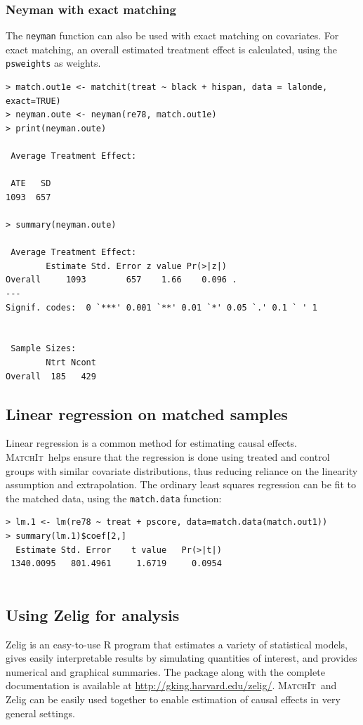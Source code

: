 \documentclass[oneside,letterpaper,titlepage]{article}
\newcommand{\MatchIt}{\textsc{MatchIt}}
\begin{document}
\subsubsection{Neyman with exact matching}
The {\tt neyman} function can also be used with exact matching on
covariates.  For exact matching, an overall estimated treatment effect
is calculated, using the {\tt psweights} as weights.

\begin{verbatim}
> match.out1e <- matchit(treat ~ black + hispan, data = lalonde, exact=TRUE)
> neyman.oute <- neyman(re78, match.out1e)
> print(neyman.oute)
 
 Average Treatment Effect:
  
 ATE   SD
1093  657
 
> summary(neyman.oute)
 
 Average Treatment Effect:
        Estimate Std. Error z value Pr(>|z|)
Overall     1093        657    1.66    0.096 .
---
Signif. codes:  0 `***' 0.001 `**' 0.01 `*' 0.05 `.' 0.1 ` ' 1
 
 
 Sample Sizes:
        Ntrt Ncont
Overall  185   429
\end{verbatim}

\subsection{Linear regression on matched samples}
\label{linreg}
Linear regression is a common method for estimating causal effects.
\MatchIt\ helps ensure that the regression is done using treated and
control groups with similar covariate distributions, thus reducing
reliance on the linearity assumption and extrapolation.  The ordinary
least squares regression can be fit to the matched data, using the
{\tt match.data} function:

\begin{verbatim}
> lm.1 <- lm(re78 ~ treat + pscore, data=match.data(match.out1))
> summary(lm.1)$coef[2,]
  Estimate Std. Error    t value   Pr(>|t|)
 1340.0095   801.4961     1.6719     0.0954


\end{verbatim} 

\subsection{Using Zelig for analysis}
Zelig is an easy-to-use R program that estimates a variety of statistical
models, gives easily interpretable results by simulating quantities of
interest, and provides numerical and graphical summaries.  The package
along with the complete documentation is available at
\href{http://gking.harvard.edu/zelig/}{http://gking.harvard.edu/zelig/}.
\MatchIt\ and Zelig can be easily used together to enable estimation
of causal effects in very general settings.
\end{document}
